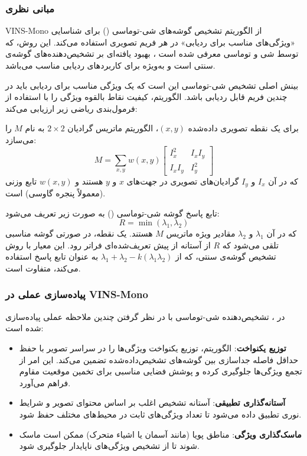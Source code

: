 \documentclass[11pt, a4paper]{article}
\begin{document}
	\subsubsection{مبانی نظری}
	VINS-Mono از الگوریتم تشخیص گوشه‌های شی-توماسی 
	() 
	برای
	شناسایی «ویژگی‌های مناسب برای ردیابی» در هر فریم تصویری استفاده می‌کند. این روش، که توسط شی و توماسی معرفی شده است \cite{shi1994good}، بهبود یافته‌ای بر تشخیص‌دهنده‌های گوشه‌ی سنتی است و به‌ویژه برای کاربردهای ردیابی مناسب می‌باشد.
	
	بینش اصلی تشخیص شی-توماسی این است که یک ویژگی مناسب برای ردیابی باید در چندین فریم قابل ردیابی باشد. الگوریتم، کیفیت نقاط بالقوه ویژگی را با استفاده از فرمول‌بندی ریاضی زیر ارزیابی می‌کند:
	
	برای یک نقطه تصویری داده‌شده $(x,y)$، الگوریتم ماتریس گرادیان $2 \times 2$ به نام $M$ را می‌سازد:
	\begin{equation*}
		M = \sum_{x,y} w(x,y) \begin{bmatrix}
			I_x^2 & I_x I_y \\
			I_x I_y & I_y^2
		\end{bmatrix}
	\end{equation*}
	که در آن $I_x$ و $I_y$ گرادیان‌های تصویری در جهت‌های $x$ و $y$ هستند و $w(x,y)$ تابع وزنی (معمولاً پنجره گاوسی) است.
	
	تابع پاسخ گوشه شی-توماسی 
	()
	به صورت زیر تعریف می‌شود:
	\begin{equation*}
		R = \min(\lambda_1, \lambda_2)
	\end{equation*}
	که در آن $\lambda_1$ و $\lambda_2$ مقادیر ویژه ماتریس $M$ هستند. یک نقطه، در صورتی گوشه مناسبی تلقی می‌شود که $R$ از آستانه از پیش تعریف‌شده‌ای فراتر رود. این معیار با روش تشخیص گوشه‌ی‌ سنتی، که از $\lambda_1 + \lambda_2 - k(\lambda_1 \lambda_2)$ به عنوان تابع پاسخ استفاده می‌کند، متفاوت است.
	
	\subsubsection{پیاده‌سازی عملی در VINS-Mono}
	در
	،
	تشخیص‌دهنده شی-توماسی با در نظر گرفتن چندین ملاحظه عملی پیاده‌سازی شده است:
	
	\begin{itemize}
		\item \textbf{توزیع یکنواخت}: الگوریتم، توزیع یکنواخت ویژگی‌ها را در سراسر تصویر با حفظ حداقل فاصله جداسازی بین گوشه‌های تشخیص‌داده‌شده تضمین می‌کند. این امر از تجمع ویژگی‌ها جلوگیری کرده و پوشش فضایی مناسبی برای تخمین موقعیت مقاوم فراهم می‌آورد.
		
		\item \textbf{آستانه‌گذاری تطبیقی}: آستانه تشخیص اغلب بر اساس محتوای تصویر و شرایط نوری تطبیق داده می‌شود تا تعداد ویژگی‌های ثابت در محیط‌های مختلف حفظ شود.
		
		\item \textbf{ماسک‌گذاری ویژگی}: مناطق پویا (مانند آسمان یا اشیاء متحرک) ممکن است ماسک شوند تا از تشخیص ویژگی‌های ناپایدار جلوگیری شود.
	\end{itemize}
	
\end{document}
